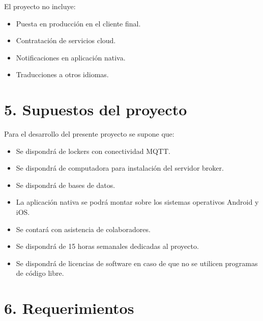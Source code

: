 \documentclass[
11pt, %
]{charter}
\begin{document}
El proyecto no incluye:

\begin{itemize}
	\item Puesta en producción en el cliente final.
	\item Contratación de servicios cloud.
	\item Notificaciones en aplicación nativa.
    \item Traducciones a otros idiomas.
\end{itemize}


\section{5. Supuestos del proyecto}
\label{sec:supuestos}

Para el desarrollo del presente proyecto se supone que:

\begin{itemize}
	\item Se dispondrá de lockers con conectividad MQTT.
	\item Se dispondrá de computadora para instalación del servidor broker.
	\item Se dispondrá de bases de datos.
    \item La aplicación nativa se podrá montar sobre los sistemas operativos Android y iOS.
    \item Se contará con asistencia de colaboradores.
    \item Se dispondrá de 15 horas semanales dedicadas al proyecto.
    \item Se dispondrá de licencias de software en caso de que no se utilicen programas de código libre.	
\end{itemize}

\section{6. Requerimientos}
\label{sec:requerimientos}
\end{document}
